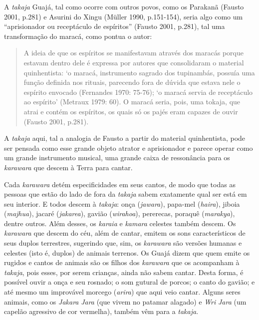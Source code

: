 A \emph{takaja} Guajá, tal como ocorre com outros povos, como os
Parakanã (Fausto 2001, p.281) e Asurini do Xingu (Müller 1990,
p.151-154), seria algo como um ``aprisionador ou receptáculo de
espíritos'' (Fausto 2001, p.281), tal uma transformação do maracá, como
pontua o autor:

\begin{quote}
A ideia de que os espíritos se manifestavam através dos maracás porque
estavam dentro dele é expressa por autores que consolidaram o material
quinhentista: `o maracá, instrumento sagrado dos tupinambás, possuía uma
função definida nos rituais, parecendo fora de dúvida que estava nele o
espírito envocado (Fernandes 1970: 75-76); `o maracá servia de
receptáculo ao espírito' (Metraux 1979: 60). O maracá seria, pois, uma
tokaja, que atrai e contém os espíritos, os quais só os pajés eram
capazes de ouvir (Fausto 2001, p.281).
\end{quote}

A \emph{takaja} aqui, tal a analogia de Fausto a partir do material
quinhentista, pode ser pensada como esse grande objeto atrator e
aprisionador e parece operar como um grande instrumento musical, uma
grande caixa de ressonância para os \emph{karawara} que descem à Terra
para cantar.

Cada \emph{karawara} detém especificidades em seus cantos, de modo que
todas as pessoas que estão do lado de fora da \emph{takaja} sabem
exatamente qual ser está em seu interior. E todos descem à
\emph{takaja}: onça (\emph{jawara}), papa-mel (\emph{haira}), jiboia
(\emph{majhua}), jacaré (\emph{jakarea}), gavião (\emph{wirahoa}),
pererecas, poraquê (\emph{marakya}), dentre outros. Além desses, os
\emph{karaia} e \emph{kamara} celestes também descem. Os \emph{karawara}
que descem do céu, além de cantar, emitem os sons característicos de
seus duplos terrestres, sugerindo que, sim, os \emph{karawara} são
versões humanas e celestes (isto é, duplos) de animais terrenos. Os
Guajá dizem que quem emite os rugidos e cantos de animais são os filhos
dos \emph{karawara} que os acompanham à \emph{takaja}, pois esses, por
serem crianças, ainda não sabem cantar. Desta forma, é possível ouvir a
onça e seu rosnado; o som gutural de porcos; o canto do gavião; e até
mesmo um improvável morcego (\emph{arira}) que aqui veio cantar. Alguns
seres animais, como os \emph{Jakara} \emph{Jara} (que vivem no patamar
alagado) e \emph{Wri} \emph{Jara} (um capelão agressivo de cor
vermelha), também vêm para a \emph{takaja}.

